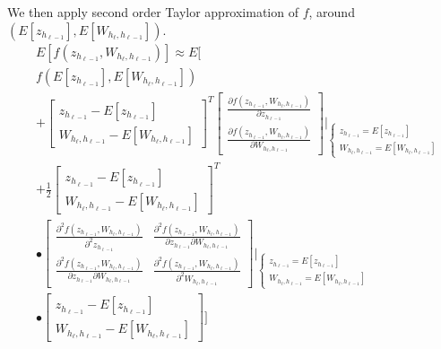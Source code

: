 We then apply second order Taylor approximation of $f$, around $(E[z_{h_{\ell-1}}], E[W_{h_{\ell}, h_{\ell-1}}])$.
\begin{equation}
\begin{aligned}
&E[f(z_{h_{\ell-1}}, W_{h_{\ell}, h_{\ell-1}})] \approx
E\Bigg[\\
&f(E[z_{h_{\ell-1}}], E[W_{h_{\ell}, h_{\ell-1}}])\\
&+ \begin{bmatrix}
z_{h_{\ell-1}} - E[z_{h_{\ell-1}}] \\ W_{h_{\ell}, h_{\ell-1}} - E[W_{h_{\ell}, h_{\ell-1}}]
\end{bmatrix}^T \begin{bmatrix}
\frac{\partial f(z_{h_{\ell-1}}, W_{h_{\ell}, h_{\ell-1}})}{\partial z_{h_{\ell-1}}} \\
\frac{\partial f(z_{h_{\ell-1}}, W_{h_{\ell}, h_{\ell-1}})}{\partial W_{h_{\ell}, h_{\ell-1}}}
\end{bmatrix} \Bigg\rvert_{
\begin{cases}
z_{h_{\ell-1}} = E[z_{h_{\ell-1}}] \\
W_{h_{\ell}, h_{\ell-1}} = E[W_{h_{\ell}, h_{\ell-1}}]
\end{cases}
} \\
&+ \frac{1}{2} \begin{bmatrix}
z_{h_{\ell-1}} - E[z_{h_{\ell-1}}] \\ W_{h_{\ell}, h_{\ell-1}} - E[W_{h_{\ell}, h_{\ell-1}}]
\end{bmatrix}^T \\
&\bullet \begin{bmatrix}
\frac{\partial^2 f(z_{h_{\ell-1}}, W_{h_{\ell}, h_{\ell-1}})}{\partial^2 z_{h_{\ell-1}}} & \frac{\partial^2 f(z_{h_{\ell-1}}, W_{h_{\ell}, h_{\ell-1}})}{\partial z_{h_{\ell-1}} \partial W_{h_{\ell}, h_{\ell-1}}} \\
\frac{\partial^2 f(z_{h_{\ell-1}}, W_{h_{\ell}, h_{\ell-1}})}{\partial z_{h_{\ell-1}} \partial W_{h_{\ell}, h_{\ell-1}}} & \frac{\partial^2 f(z_{h_{\ell-1}}, W_{h_{\ell}, h_{\ell-1}})}{\partial^2 W_{h_{\ell}, h_{\ell-1}}}
\end{bmatrix} \Bigg\rvert_{
\begin{cases}
z_{h_{\ell-1}} = E[z_{h_{\ell-1}}] \\
W_{h_{\ell}, h_{\ell-1}} = E[W_{h_{\ell}, h_{\ell-1}}]
\end{cases}
} \\
&\bullet \begin{bmatrix}
z_{h_{\ell-1}} - E[z_{h_{\ell-1}}] \\ W_{h_{\ell}, h_{\ell-1}} - E[W_{h_{\ell}, h_{\ell-1}}]
\end{bmatrix}\Bigg]
\end{aligned}
\end{equation}

